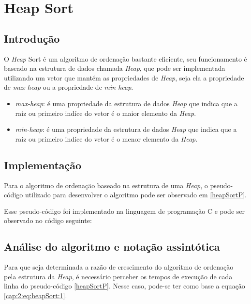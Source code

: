 \section{Heap Sort} \label{cap:2:section:hsort}

\subsection{Introdução}

O \textit{Heap} Sort é um algoritmo de ordenação bastante eficiente, seu funcionamento é baseado
na estrutura de dados chamada \textit{Heap}, que pode ser implementada utilizando um vetor que
mantém as propriedades de \textit{Heap}, seja ela a propriedade de \textit{max-heap} ou a propriedade
de \textit{min-heap}.

\begin{itemize}

    \item \textit{max-heap}: é uma propriedade da estrutura de dados \textit{Heap} que indica que
    a raiz ou primeiro indíce do vetor é o maior elemento da \textit{Heap}.
    \item \textit{min-heap}: é uma propriedade da estrutura de dados \textit{Heap} que indica que
    a raiz ou primeiro indíce do vetor é o menor elemento da \textit{Heap}.

\end{itemize}

\subsection{Implementação}

Para o algoritmo de ordenação baseado na estrutura de uma \textit{Heap}, o pseudo-código utilizado para desenvolver o
algoritmo pode ser observado em \ref{heapSortP}.



Esse pseudo-código foi implementado na linguagem de programação C 
e pode ser observado no código seguinte:



\subsection{Análise do algoritmo e notação assintótica}

Para que seja determinada a razão de crescimento do algoritmo de ordenação pela estrutura da \textit{Heap}, é necessário
perceber os tempos de execução de cada linha do pseudo-código \ref{heapSortP}.
Nesse caso, pode-se ter como base a equação \ref{cap:2:eq:heapSort:1}.

